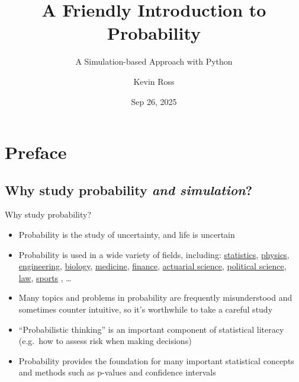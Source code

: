 \documentclass[
  letterpaper,
  DIV=11,
  numbers=noendperiod]{scrreprt}
\title{A Friendly Introduction to Probability}
\subtitle{A Simulation-based Approach with Python}
\author{Kevin Ross}
\date{Sep 26, 2025}
\providecommand{\tightlist}{%
  \setlength{\itemsep}{0pt}\setlength{\parskip}{0pt}}
\renewcommand*\contentsname{Table of contents}
\newcommand\contentsname{Table of contents}
\theoremstyle{plain}
\theoremstyle{definition}
\theoremstyle{definition}
\theoremstyle{definition}
\theoremstyle{remark}
\begin{document}
\maketitle

\renewcommand*\contentsname{Table of contents}
{
\hypersetup{linkcolor=}
\setcounter{tocdepth}{2}
\tableofcontents
}


\chapter*{Preface}\label{preface}


\section*{\texorpdfstring{Why study probability \emph{and
simulation}?}{Why study probability and simulation?}}\label{why-study-probability-and-simulation}


Why study probability?

\begin{itemize}
\tightlist
\item
  Probability is the study of uncertainty, and life is uncertain
\item
  Probability is used in a wide variety of fields, including:
  \href{https://fivethirtyeight.com/features/not-even-scientists-can-easily-explain-p-values/}{statistics},
  \href{https://www.ucdavis.edu/news/does-probability-come-quantum-physics/}{physics},
  \href{https://en.wikipedia.org/wiki/Signal_processing}{engineering},
  \href{https://www.ncbi.nlm.nih.gov/pmc/articles/PMC3843941/}{biology},
  \href{https://cvi.asm.org/content/cdli/23/4/249.full.pdf}{medicine},
  \href{https://www.marketwatch.com/story/the-4-called-the-last-financial-crisis-heres-what-they-see-causing-the-next-one-2018-09-13}{finance},
  \href{https://www.ssa.gov/oact/STATS/table4c6.html}{actuarial
  science},
  \href{https://projects.fivethirtyeight.com/2016-election-forecast/}{political
  science},
  \href{https://en.wikipedia.org/wiki/Prosecutor\%27s_fallacy}{law},
  \href{https://www.numberfire.com/nfl/lists/18685/the-10-biggest-plays-of-super-bowl-lii}{sports}
  , \ldots{}
\item
  Many topics and problems in probability are frequently misunderstood
  and sometimes counter intuitive, so it's worthwhile to take a careful
  study
\item
  ``Probabilistic thinking'' is an important component of statistical
  literacy (e.g.~how to assess risk when making decisions)
\item
  Probability provides the foundation for many important statistical
  concepts and methods such as p-values and confidence intervals
\end{itemize}
\end{document}
